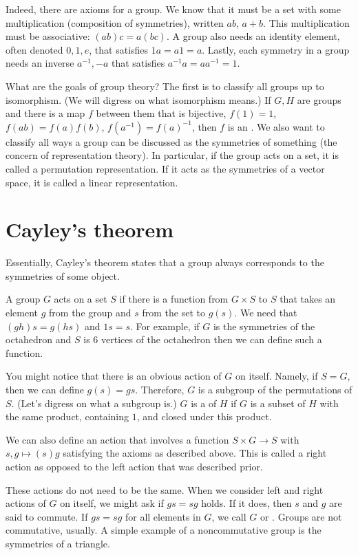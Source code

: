 \documentclass[11pt, oneside]{amsart}
\begin{document}
Indeed, there are axioms for a group. We know that it must be a set with some multiplication (composition of symmetries), written $ab$, $a+b$. This multiplication must be associative: $(ab)c = a(bc)$. A group also needs an identity element, often denoted $0,1,e$, that satisfies $1a = a1 = a$. Lastly, each symmetry in a group needs an inverse $a^{-1}, -a$ that satisfies $a^{-1}a = aa^{-1} = 1$.

What are the goals of group theory? The first is to classify all groups up to isomorphism. (We will digress on what isomorphism means.) If $G,H$ are groups and there is a map $f$ between them that is bijective, $f(1) = 1$, $f(ab) = f(a) f(b)$, $f(a^{-1}) = f(a)^{-1}$, then $f$ is an . We also want to classify all ways a group can be discussed as the symmetries of something (the concern of representation theory). In particular, if the group acts on a set, it is called a permutation representation. If it acts as the symmetries of a vector space, it is called a linear representation.

\section{Cayley's theorem}
Essentially, Cayley's theorem states that a group always corresponds to the symmetries of some object. 

A group $G$ acts on a set $S$ if there is a function from $G\times S$ to $S$ that takes an element $g$ from the group and $s$ from the set to $g(s)$. We need that $(gh)s = g(hs)$ and $1 s=s$. For example, if $G$ is the symmetries of the octahedron and $S$ is $6$ vertices of the octahedron then we can define such a function.

You might notice that there is an obvious action of $G$ on itself. Namely, if $S=G$, then we can define $g(s)=gs$. Therefore, $G$ is a subgroup of the permutations of $S$. (Let's digress on what a subgroup is.) $G$ is a  of $H$ if $G$ is a subset of $H$ with the same product, containing $1$, and closed under this product.

We can also define an action that involves a function $S\times G \longrightarrow S$ with $s,g \mapsto (s)g$ satisfying the axioms as described above. This is called a right action as opposed to the left action that was described prior. 

These actions do not need to be the same. When we consider left and right actions of $G$ on itself, we might ask if $gs=sg$ holds. If it does, then $s$ and $g$ are said to commute. If $gs=sg$ for all elements in $G$, we call $G$  or . Groups are not commutative, usually. A simple example of a noncommutative group is the symmetries of a triangle.
\end{document}
